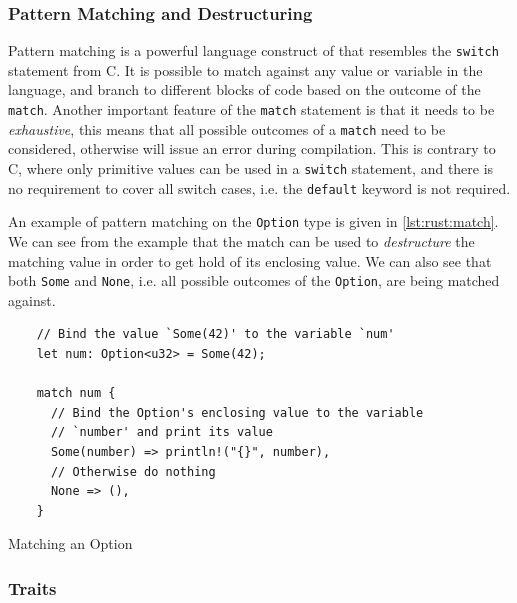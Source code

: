 \subsubsection{Pattern Matching and Destructuring}
\label{sub:pattern_matching}

Pattern matching is a powerful language construct of \rust that resembles the \texttt{switch} statement from C.
It is possible to match against any value or variable in the language, and branch to different blocks of code based on the outcome of the \texttt{match}.
Another important feature of the \texttt{match} statement is that it needs to be \emph{exhaustive}, this means that all possible outcomes of a \texttt{match} need to be considered, otherwise \rust will issue an error during compilation.
This is contrary to C, where only primitive values can be used in a \texttt{switch} statement, and there is no requirement to cover all switch cases, i.e. the \texttt{default} keyword is not required.

An example of pattern matching on the \texttt{Option} type is given in \autoref{lst:rust:match}.
We can see from the example that the match can be used to \emph{destructure} the matching value in order to get hold of its enclosing value.
We can also see that both \texttt{Some} and \texttt{None}, i.e. all possible outcomes of the \texttt{Option}, are being matched against.

\begin{listing}[H]
  \begin{verbatim}
    // Bind the value `Some(42)' to the variable `num'
    let num: Option<u32> = Some(42);

    match num {
      // Bind the Option's enclosing value to the variable
      // `number' and print its value
      Some(number) => println!("{}", number),
      // Otherwise do nothing
      None => (),
    }
  \end{verbatim}
  \caption{Matching an Option}
  \label{lst:rust:match}
\end{listing}

\subsubsection{Traits}

